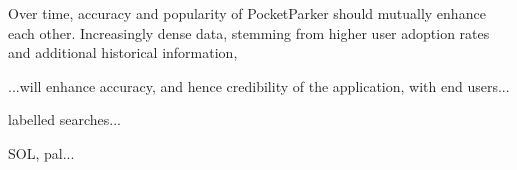 Over time, accuracy and popularity of PocketParker should mutually enhance
each other.  Increasingly dense data, stemming from higher user adoption rates
and additional historical information, 

...will enhance accuracy, and hence credibility of the application, with end users...




labelled searches...



SOL, pal...





